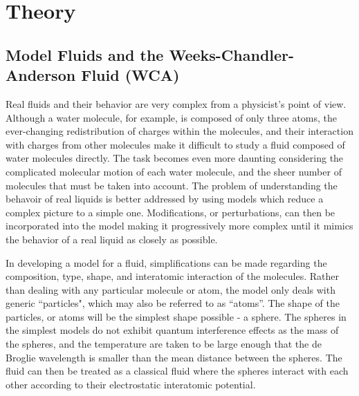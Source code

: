 \documentclass[double,12pt]{beavtex}
\begin{document}
\chapter{Theory}

\section{Model Fluids and the Weeks-Chandler-Anderson Fluid (WCA)}

Real fluids and their behavior are very complex from a physicist's point of view. Although a water molecule, for example, is composed of only three atoms, the ever-changing redistribution of charges within the molecules, and their interaction with charges from other molecules make it difficult to study a fluid composed of water molecules directly. The task becomes even more daunting considering the complicated molecular motion of each water molecule, and the sheer number of molecules that must be taken into account. 
The problem of understanding the behavoir of real liquids is better addressed by using models which reduce a complex picture to a simple one. Modifications, or perturbations, can then be incorporated into the model making it progressively more complex until it mimics the behavior of a real liquid as closely as possible.

In developing a model for a fluid, simplifications can be made regarding the composition, type, shape, and interatomic interaction of the molecules. Rather than dealing with any particular molecule or atom, the model only deals with generic ``particles", which may also be referred to as ``atoms''. The shape of the particles, or atoms will be the simplest shape possible - a sphere. The spheres in the simplest models do not exhibit quantum interference effects as the mass of the spheres, and the temperature are taken to be large enough that the de Broglie wavelength is smaller than the mean distance between the spheres. The fluid can then be treated as a classical fluid where the spheres interact with each other according to their electrostatic interatomic potential. 
\end{document}
